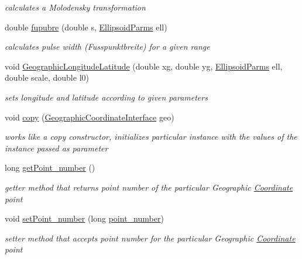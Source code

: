 \begin{DoxyCompactItemize}
\begin{DoxyCompactList}\small\item\em calculates a Molodensky transformation \end{DoxyCompactList}\item 
double \hyperlink{classcoordinates_1_1_geographic_coordinate_interface_a221ccb34f7c04980aec4af015b1c2789}{fupubre} (double s, \hyperlink{classparams_1_1_ellipsoid_parms}{Ellipsoid\+Parms} ell)
\begin{DoxyCompactList}\small\item\em calculates pulse width (Fusspunktbreite) for a given range \end{DoxyCompactList}\item 
void \hyperlink{classcoordinates_1_1_geographic_coordinate_interface_a1054ed7d1c0497e91fcc4f098c06e1e5}{Geographic\+Longitude\+Latitude} (double xg, double yg, \hyperlink{classparams_1_1_ellipsoid_parms}{Ellipsoid\+Parms} ell, double scale, double l0)
\begin{DoxyCompactList}\small\item\em sets longitude and latitude according to given parameters \end{DoxyCompactList}\item 
void \hyperlink{classcoordinates_1_1_geographic_coordinate_interface_a4c99b99a9e6e653b72cf0da99f603a19}{copy} (\hyperlink{classcoordinates_1_1_geographic_coordinate_interface}{Geographic\+Coordinate\+Interface} geo)
\begin{DoxyCompactList}\small\item\em works like a copy constructor, initializes particular instance with the values of the instance passed as parameter \end{DoxyCompactList}\item 
long \hyperlink{classcoordinates_1_1_geographic_coordinate_interface_acdd7ae9bfafda4672d697221bd9b0bd2}{get\+Point\+\_\+number} ()
\begin{DoxyCompactList}\small\item\em getter method that returns point number of the particular Geographic \hyperlink{classcoordinates_1_1_coordinate}{Coordinate} point \end{DoxyCompactList}\item 
void \hyperlink{classcoordinates_1_1_geographic_coordinate_interface_a50835144a956800c57f7a5a9d3491cb6}{set\+Point\+\_\+number} (long \hyperlink{classcoordinates_1_1_geographic_coordinate_interface_abfad220dc359597518b9f199be6b957a}{point\+\_\+number})
\begin{DoxyCompactList}\small\item\em setter method that accepts point number for the particular Geographic \hyperlink{classcoordinates_1_1_coordinate}{Coordinate} point \end{DoxyCompactList}\item 

\end{DoxyCompactItemize}
